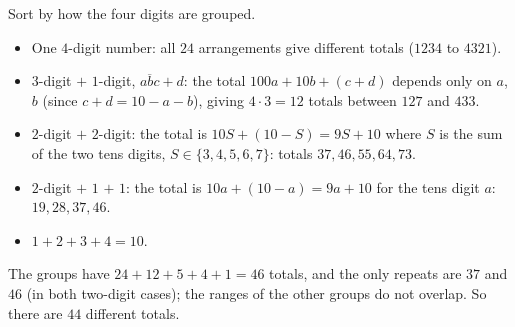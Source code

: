 Sort by how the four digits are grouped.
\begin{itemize}
\item One $4$-digit number: all $24$ arrangements give different totals ($1234$ to $4321$).
\item $3$-digit $+$ $1$-digit, $\overline{abc}+d$: the total $100a+10b+(c+d)$ depends only on $a$, $b$ (since $c+d=10-a-b$), giving $4\cdot3=12$ totals between $127$ and $433$.
\item $2$-digit $+$ $2$-digit: the total is $10S+(10-S)=9S+10$ where $S$ is the sum of the two tens digits, $S\in\{3,4,5,6,7\}$: totals $37,46,55,64,73$.
\item $2$-digit $+$ $1$ $+$ $1$: the total is $10a+(10-a)=9a+10$ for the tens digit $a$: $19,28,37,46$.
\item $1+2+3+4=10$.
\end{itemize}
The groups have $24+12+5+4+1=46$ totals, and the only repeats are $37$ and $46$ (in both two-digit cases); the ranges of the other groups do not overlap. So there are $\boxed{44}$ different totals.

